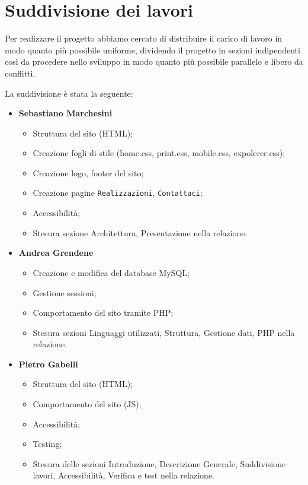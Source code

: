 \section{Suddivisione dei lavori}{
	Per realizzare il progetto abbiamo cercato di distribuire il carico di lavoro in modo quanto più possibile uniforme, dividendo il progetto in sezioni indipendenti così da procedere nello sviluppo in modo quanto più possibile parallelo e libero da conflitti.
	
	La suddivisione è stata la seguente: 	
	\begin{itemize}\itemsep1pt
		\item \textbf{Sebastiano Marchesini} 
		\begin{itemize}\itemsep1pt
			\item Struttura del sito (HTML);
			\item Creazione fogli di stile (home.css, print.css, mobile.css, expolerer.css);
			\item Creazione logo, footer del sito;
			\item Creazione pagine \texttt{Realizzazioni}, \texttt{Contattaci};
			\item Accessibilità;
			\item Stesura sezione Architettura, Presentazione nella relazione.
		\end{itemize}
		\item \textbf{Andrea Grendene}
		\begin{itemize}\itemsep1pt
			\item Creazione e modifica del database MySQL;
			\item Gestione sessioni;
			\item Comportamento del sito tramite PHP;
			\item Stesura sezioni Linguaggi utilizzati, Struttura, Gestione dati, PHP nella relazione.
		\end{itemize}
		\item \textbf{Pietro Gabelli}
		\begin{itemize}\itemsep1pt
			\item Struttura del sito (HTML);
			\item Comportamento del sito (JS);
			\item Accessibilità;
			\item Testing;
			\item Stesura delle sezioni Introduzione, Descrizione Generale, Suddivisione lavori,  Accessibilità, Verifica e test nella relazione.
		\end{itemize}
	\end{itemize}
}